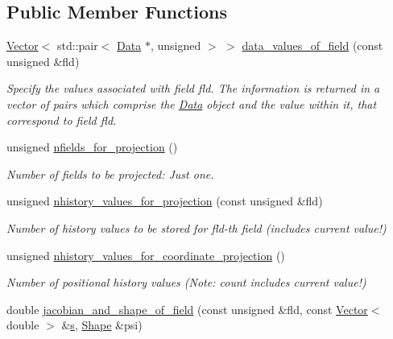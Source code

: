 \subsection*{Public Member Functions}
\begin{DoxyCompactItemize}
\item 
\hyperlink{classoomph_1_1Vector}{Vector}$<$ std\+::pair$<$ \hyperlink{classoomph_1_1Data}{Data} $\ast$, unsigned $>$ $>$ \hyperlink{classoomph_1_1ProjectablePoissonElement_a9ee630c0affbb44077365bc9309ce1a1}{data\+\_\+values\+\_\+of\+\_\+field} (const unsigned \&fld)
\begin{DoxyCompactList}\small\item\em Specify the values associated with field fld. The information is returned in a vector of pairs which comprise the \hyperlink{classoomph_1_1Data}{Data} object and the value within it, that correspond to field fld. \end{DoxyCompactList}\item 
unsigned \hyperlink{classoomph_1_1ProjectablePoissonElement_a0b8e911e3eca8dbfecd30a5e8dc2ff33}{nfields\+\_\+for\+\_\+projection} ()
\begin{DoxyCompactList}\small\item\em Number of fields to be projected\+: Just one. \end{DoxyCompactList}\item 
unsigned \hyperlink{classoomph_1_1ProjectablePoissonElement_a6256481549383c8abdd666f691e3dbed}{nhistory\+\_\+values\+\_\+for\+\_\+projection} (const unsigned \&fld)
\begin{DoxyCompactList}\small\item\em Number of history values to be stored for fld-\/th field (includes current value!) \end{DoxyCompactList}\item 
unsigned \hyperlink{classoomph_1_1ProjectablePoissonElement_a42e8ec2cd54a3301190d2b3a10e66370}{nhistory\+\_\+values\+\_\+for\+\_\+coordinate\+\_\+projection} ()
\begin{DoxyCompactList}\small\item\em Number of positional history values (Note\+: count includes current value!) \end{DoxyCompactList}\item 
double \hyperlink{classoomph_1_1ProjectablePoissonElement_a0fa8292f5be360a3c8727cb1790506aa}{jacobian\+\_\+and\+\_\+shape\+\_\+of\+\_\+field} (const unsigned \&fld, const \hyperlink{classoomph_1_1Vector}{Vector}$<$ double $>$ \&\hyperlink{cfortran_8h_ab7123126e4885ef647dd9c6e3807a21c}{s}, \hyperlink{classoomph_1_1Shape}{Shape} \&psi)

\end{DoxyCompactItemize}
